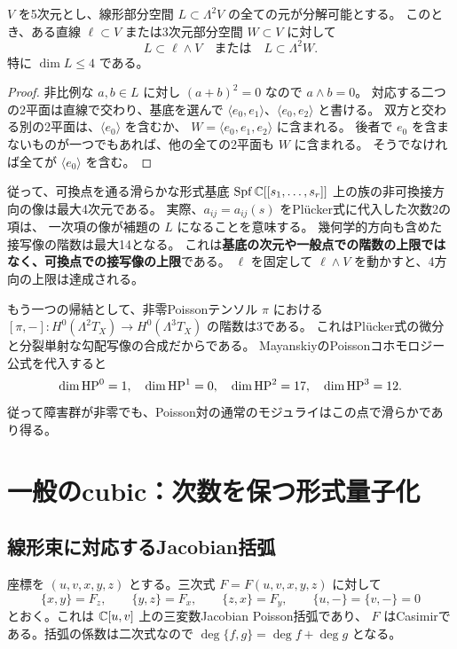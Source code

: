 \begin{lemma}\label{lem:linear}
$V$ を5次元とし、線形部分空間 $L\subset\Lambda^2V$ の全ての元が分解可能とする。
このとき、ある直線 $\ell\subset V$ または3次元部分空間 $W\subset V$ に対して
\[
 L\subset\ell\wedge V
 \quad\text{または}\quad
 L\subset\Lambda^2W.
\]
特に $\dim L\le4$ である。
\end{lemma}

\begin{proof}
非比例な $a,b\in L$ に対し $(a+b)^2=0$ なので $a\wedge b=0$。
対応する二つの2平面は直線で交わり、基底を選んで
$\langle e_0,e_1\rangle$、$\langle e_0,e_2\rangle$ と書ける。
双方と交わる別の2平面は、$\langle e_0\rangle$ を含むか、
$W=\langle e_0,e_1,e_2\rangle$ に含まれる。
後者で $e_0$ を含まないものが一つでもあれば、他の全ての2平面も $W$ に含まれる。
そうでなければ全てが $\langle e_0\rangle$ を含む。
\end{proof}

従って、可換点を通る滑らかな形式基底
$\operatorname{Spf}\mathbb C[[s_1,\ldots,s_r]]$ 上の族の非可換接方向の像は最大4次元である。
実際、$a_{ij}=a_{ij}(s)$ をPlücker式に代入した次数2の項は、
一次項の像が補題の $L$ になることを意味する。
幾何学的方向も含めた接写像の階数は最大14となる。
これは\textbf{基底の次元や一般点での階数の上限ではなく、可換点での接写像の上限}である。
$\ell$ を固定して $\ell\wedge V$ を動かすと、4方向の上限は達成される。

もう一つの帰結として、非零Poissonテンソル $\pi$ における
$[\pi,-]:H^0(\Lambda^2T_X)\to H^0(\Lambda^3T_X)$ の階数は3である。
これはPlücker式の微分と分裂単射な勾配写像の合成だからである。
MayanskiyのPoissonコホモロジー公式\cite[Theorem 2]{May}を代入すると
\[
 \dim\operatorname{HP}^0=1,\quad \dim\operatorname{HP}^1=0,\quad
 \dim\operatorname{HP}^2=17,\quad \dim\operatorname{HP}^3=12.
\]
従って障害群が非零でも、Poisson対の通常のモジュライはこの点で滑らかであり得る。

\section{一般のcubic：次数を保つ形式量子化}

\subsection{線形束に対応するJacobian括弧}

座標を $(u,v,x,y,z)$ とする。三次式 $F=F(u,v,x,y,z)$ に対して
\begin{equation}\label{eq:jac}
 \{x,y\}=F_z,\qquad \{y,z\}=F_x,\qquad \{z,x\}=F_y,
 \qquad \{u,-\}=\{v,-\}=0
\end{equation}
とおく。これは $\mathbb C[u,v]$ 上の三変数Jacobian Poisson括弧であり、
$F$ はCasimirである。括弧の係数は二次式なので
$\deg\{f,g\}=\deg f+\deg g$ となる。

